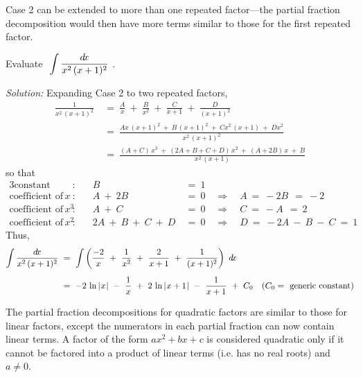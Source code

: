 Case 2 can be extended to more than one repeated factor---the partial
fraction decomposition would then have more terms similar to those for the
first repeated factor.
\newpage
\begin{exmp}\label{exmp:partfrac3}
\noindent Evaluate $~\displaystyle\int \frac{d\!x}{x^2\,(x+1)^2}~$.\vspace{1mm}
\par\noindent\emph{Solution:} Expanding Case 2 to two repeated factors,
\begin{align*}
\frac{1}{x^2\,(x+1)^2} ~&=~ \frac{A}{x} ~+~ \frac{B}{x^2} ~+~ \frac{C}{x+1}
 ~+~ \frac{D}{(x+1)^2}\\[4pt]
&=~ \frac{Ax\,(x+1)^2 ~+~ B\,(x+1)^2 ~+~ Cx^2\,(x+1) ~+~ Dx^2}{x^2\,(x+1)^2}\\[4pt]
&=~ \frac{(A+C)\,x^3 ~+~ (2A+B+C+D)\,x^2 ~+~ (A+2B)\,x ~+~ B}{x^2\,(x+1)}
\end{align*}
so that
\begin{alignat*}{3}
\text{constant term}&: &  B ~&=~ 1\\
\text{coefficient of $x$}&: \quad & A ~+~ 2B ~&=~ 0 \quad\Rightarrow\quad A ~=~ -2B ~~=~ -2\\
\text{coefficient of $x^3$}&: \quad & A ~+~ C ~&=~ 0 \quad\Rightarrow\quad C ~=~ -A ~~=~ 2\\
\text{coefficient of $x^2$}&: \quad & 2A ~+~ B ~+~ C ~+~ D ~&=~ 0
  \quad\Rightarrow\quad D ~=~ -2A ~-~ B ~-~ C ~=~ 1
\end{alignat*}
Thus,
\begin{align*}
\int \frac{d\!x}{x^2\,(x+1)^2} ~&=~ \int \left(\frac{-2}{x} ~+~ \frac{1}{x^2} ~+~
\frac{2}{x+1} ~+~ \frac{1}{(x+1)^2}\right)~d\!x\\[6pt]
&=~ -2\,\ln\,\lvert\mspace{1mu}x\mspace{1mu}\rvert ~-~ \frac{1}{x} ~+~ 2\,\ln\,\lvert\mspace{1mu}x+1\mspace{1mu}\rvert ~-~ \frac{1}{x+1} ~+~ C_0
\quad\text{($C_0 =~$ generic constant)}
\end{align*}
\end{exmp}
\divider
\vspace{2mm}

The partial fraction decompositions for quadratic factors are similar to those
for linear factors, except the numerators in each partial fraction can now
contain linear terms. A factor of the form $ax^2 + bx + c$ is considered
quadratic only if it cannot be factored into a product of linear terms (i.e. has
no real roots) and $a \ne 0$.

